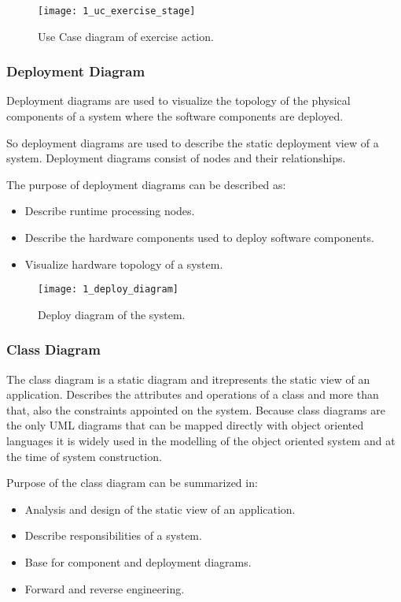 \begin{figure}[!h]
\centering
\texttt{[image: 1\_uc\_exercise\_stage]}
\caption{Use Case diagram of exercise action.}\label{uc_exercise}
\end{figure}



\subsubsection{Deployment Diagram}
Deployment diagrams are used to visualize the topology of the physical components of a system where the software components are deployed.

So deployment diagrams are used to describe the static deployment view of a system. Deployment diagrams consist of nodes and their relationships.

The purpose of deployment diagrams can be described as:
\begin{itemize}
\item Describe runtime processing nodes.
\item Describe the hardware components used to deploy software components.
\item Visualize hardware topology of a system.
\end{itemize}

\vspace{0.2cm}


\begin{figure}[!h]
\centering
\texttt{[image: 1\_deploy\_diagram]}
\caption{Deploy diagram of the system.}\label{deploy_diagram}
\end{figure}

\clearpage

\subsubsection{Class Diagram}
The class diagram is a static diagram and itrepresents the static view of an application. Describes the attributes and operations of a class and more than that, also the constraints appointed on the system.
Because class diagrams are the only UML diagrams that can be mapped directly with object oriented languages it is widely used in the modelling of the object oriented system and at the time of system construction.

Purpose of the class diagram can be summarized in:

\begin{itemize}
\item Analysis and design of the static view of an application.
\item Describe responsibilities of a system.
\item Base for component and deployment diagrams.
\item Forward and reverse engineering.
\end{itemize}

